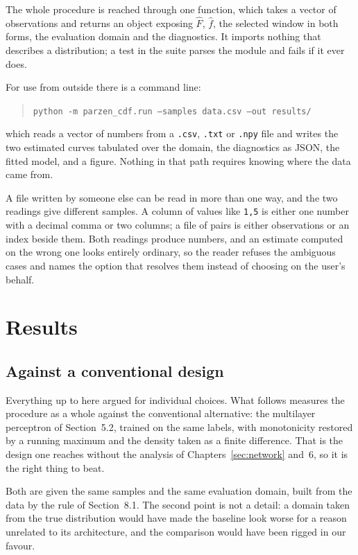 \documentclass[11pt]{article}
\newcommand{\Fhat}{\widehat{F}}
\newcommand{\fhat}{\widehat{f}}
\begin{document}
The whole procedure is reached through one function, which takes a vector of observations and
returns an object exposing $\Fhat$, $\fhat$, the selected window in both forms, the evaluation
domain and the diagnostics. It imports nothing that describes a distribution; a test in the
suite parses the module and fails if it ever does.

For use from outside there is a command line:
\begin{quote}
\texttt{python -m parzen\_cdf.run --samples data.csv --out results/}
\end{quote}
which reads a vector of numbers from a \texttt{.csv}, \texttt{.txt} or \texttt{.npy} file and
writes the two estimated curves tabulated over the domain, the diagnostics as JSON, the fitted
model, and a figure. Nothing in that path requires knowing where the data came from.

A file written by someone else can be read in more than one way, and the two readings give
different samples. A column of values like \texttt{1,5} is either one number with a decimal
comma or two columns; a file of pairs is either observations or an index beside them. Both
readings produce numbers, and an estimate computed on the wrong one looks entirely ordinary,
so the reader refuses the ambiguous cases and names the option that resolves them instead of
choosing on the user's behalf.

\section{Results}
\label{sec:results}

\subsection{Against a conventional design}

Everything up to here argued for individual choices. What follows measures the procedure as a
whole against the conventional alternative: the multilayer perceptron of Section~5.2, trained
on the same labels, with monotonicity restored by a running maximum and the density taken as a
finite difference. That is the design one reaches without the analysis of
Chapters~\ref{sec:network} and~6, so it is the right thing to beat.

Both are given the same samples and the same evaluation domain, built from the data by the
rule of Section~8.1. The second point is not a detail: a domain taken from the true
distribution would have made the baseline look worse for a reason unrelated to its
architecture, and the comparison would have been rigged in our favour.
\end{document}
